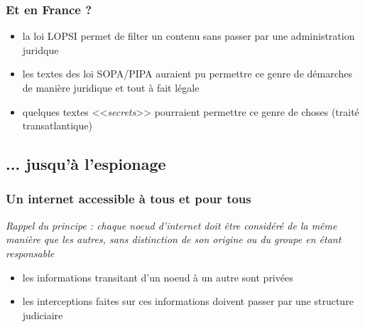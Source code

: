 \begin{frame}\frametitle{Et en France ?}
    \begin{itemize}
        \item la loi \textsc{LOPSI} permet de filter un contenu sans passer
            par une administration juridque
        \item les textes des loi \textsc{SOPA/PIPA} auraient pu permettre ce
            genre de démarches de manière juridique et tout à fait légale
        \item quelques textes <<\emph{secrets}>> pourraient permettre ce genre
            de choses (traité transatlantique)
    \end{itemize}
\end{frame}


\subsection{... jusqu'à l'espionage}
\begin{frame}\frametitle{Un internet accessible à tous et pour tous}
    \emph{Rappel du principe : chaque noeud d'internet doit être considéré de
        la même manière que les autres, sans distinction de son origine ou du
    groupe en étant responsable}

    \vspace{1em}

    \begin{itemize}
        \item les informations transitant d'un noeud à un autre sont privées
        \item les interceptions faites sur ces informations doivent passer par
            une structure judiciaire
    \end{itemize}
\end{frame}


